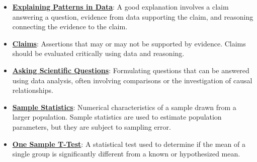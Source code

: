 \documentclass{article}%
\begin{document}
\begin{itemize}[leftmargin=*]%
\item \href{https://purdue.brightspace.com/d2l/common/assets/pdfjs-d2l-dist/1.0.14-legacy/web/viewer.html?file=\%2Fcontent\%2Fenforced\%2F1095465-WL.202510.CS24200.LE1\%2F13L2-hypothesis.pdf\%3Fou\%3D1095465\&lang=en-us\&container=d2l-fileviewer-rendered-pdf\&fullscreen=d2l-fileviewer-rendered-pdf-dialog\&height=667#page=3}{\textbf{Explaining Patterns in Data}}: A good explanation involves a claim answering a question, evidence from data supporting the claim, and reasoning connecting the evidence to the claim.%
\item \href{https://purdue.brightspace.com/d2l/common/assets/pdfjs-d2l-dist/1.0.14-legacy/web/viewer.html?file=\%2Fcontent\%2Fenforced\%2F1095465-WL.202510.CS24200.LE1\%2F13L2-hypothesis.pdf\%3Fou\%3D1095465\&lang=en-us\&container=d2l-fileviewer-rendered-pdf\&fullscreen=d2l-fileviewer-rendered-pdf-dialog\&height=667#page=4}{\textbf{Claims}}: Assertions that may or may not be supported by evidence. Claims should be evaluated critically using data and reasoning.%
\item \href{https://purdue.brightspace.com/d2l/common/assets/pdfjs-d2l-dist/1.0.14-legacy/web/viewer.html?file=\%2Fcontent\%2Fenforced\%2F1095465-WL.202510.CS24200.LE1\%2F13L2-hypothesis.pdf\%3Fou\%3D1095465\&lang=en-us\&container=d2l-fileviewer-rendered-pdf\&fullscreen=d2l-fileviewer-rendered-pdf-dialog\&height=667#page=10}{\textbf{Asking Scientific Questions}}: Formulating questions that can be answered using data analysis, often involving comparisons or the investigation of causal relationships.%
\item \href{https://purdue.brightspace.com/d2l/common/assets/pdfjs-d2l-dist/1.0.14-legacy/web/viewer.html?file=\%2Fcontent\%2Fenforced\%2F1095465-WL.202510.CS24200.LE1\%2F13L2-hypothesis.pdf\%3Fou\%3D1095465\&lang=en-us\&container=d2l-fileviewer-rendered-pdf\&fullscreen=d2l-fileviewer-rendered-pdf-dialog\&height=667#page=11}{\textbf{Sample Statistics}}: Numerical characteristics of a sample drawn from a larger population. Sample statistics are used to estimate population parameters, but they are subject to sampling error.%
\item \href{https://purdue.brightspace.com/d2l/common/assets/pdfjs-d2l-dist/1.0.14-legacy/web/viewer.html?file=\%2Fcontent\%2Fenforced\%2F1095465-WL.202510.CS24200.LE1\%2F13L2-hypothesis.pdf\%3Fou\%3D1095465\&lang=en-us\&container=d2l-fileviewer-rendered-pdf\&fullscreen=d2l-fileviewer-rendered-pdf-dialog\&height=667#page=25}{\textbf{One Sample T{-}Test}}: A statistical test used to determine if the mean of a single group is significantly different from a known or hypothesized mean.%

\end{itemize}
\end{document}
